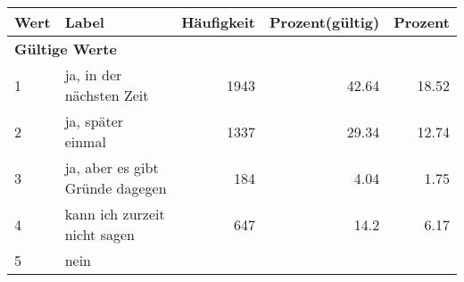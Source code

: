      \begin{longtable}{lXrrr}
     \toprule
     \textbf{Wert} & \textbf{Label} & \textbf{Häufigkeit} & \textbf{Prozent(gültig)} & \textbf{Prozent} \\
     \endhead
     \midrule
     \multicolumn{5}{l}{\textbf{Gültige Werte}}\\

     1 &
     \multicolumn{1}{X}{ ja, in der nächsten Zeit   } &


       \num{1943} &
       \num[round-mode=places,round-precision=2]{42.64} &
         \num[round-mode=places,round-precision=2]{18.52} \\

     2 &
     \multicolumn{1}{X}{ ja, später einmal   } &


       \num{1337} &
       \num[round-mode=places,round-precision=2]{29.34} &
         \num[round-mode=places,round-precision=2]{12.74} \\

     3 &
     \multicolumn{1}{X}{ ja, aber es gibt Gründe dagegen   } &


       \num{184} &
       \num[round-mode=places,round-precision=2]{4.04} &
         \num[round-mode=places,round-precision=2]{1.75} \\

     4 &
     \multicolumn{1}{X}{ kann ich zurzeit nicht sagen   } &


       \num{647} &
       \num[round-mode=places,round-precision=2]{14.2} &
         \num[round-mode=places,round-precision=2]{6.17} \\

     5 &
     \multicolumn{1}{X}{ nein   } &



\end{longtable}
